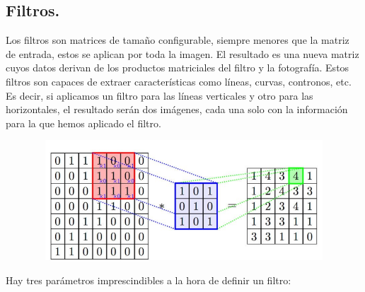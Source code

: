 \documentclass[a4paper,10pt]{article}
\begin{document}
\subsection{Filtros.}
Los filtros son matrices de tamaño configurable, siempre menores que la matriz de entrada, estos se aplican por toda la imagen. El resultado es una nueva matriz cuyos datos derivan de los productos matriciales del filtro y la fotografía. Estos filtros son capaces de extraer características como líneas, curvas, contronos, etc.  \\Es decir, si aplicamos un filtro para las líneas verticales y otro para las horizontales, el resultado serán dos imágenes, cada una solo con la información para la que hemos aplicado el filtro.
\begin{figure}[H]
\centering
\includegraphics[width=12.0cm, height=4.5cm]{Annotation 2020-04-13 191448.png}
\end{figure}
Hay tres parámetros imprescindibles a la hora de definir un filtro:
\end{document}
